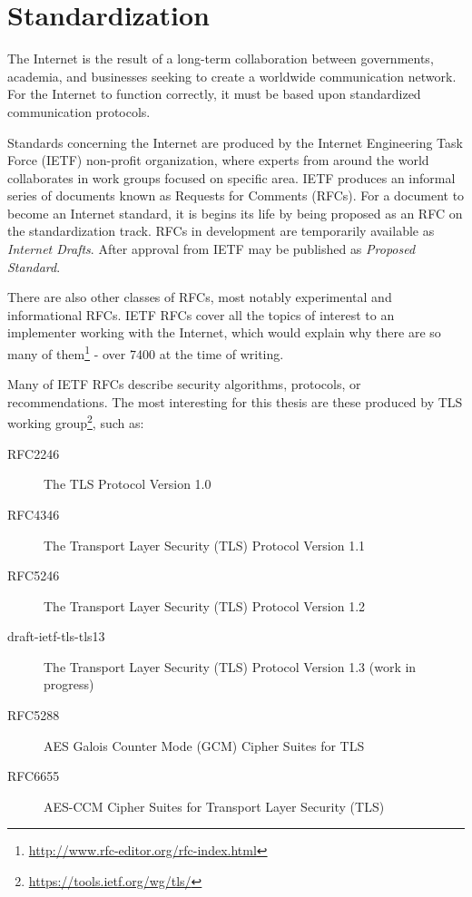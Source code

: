 \section{Standardization}

The Internet is the result of a long-term collaboration between governments, academia, and businesses seeking to create a worldwide communication network. For the Internet to function correctly, it must be based upon standardized communication protocols.

Standards concerning the Internet are produced by the Internet Engineering Task Force (IETF) non-profit organization, where experts from around the world collaborates in work groups focused on specific area. IETF produces an informal series of documents known as Requests for Comments (RFCs). For a document to become an Internet standard, it is begins its life by being proposed as an RFC on the standardization track. RFCs in development are temporarily available as \textit{Internet Drafts}. After approval from IETF may be published as \textit{Proposed Standard}. \cite{dent2004user}

There are also other classes of RFCs, most notably experimental and informational RFCs. IETF RFCs cover all the topics of interest to an implementer working with the Internet, which would explain why there are so many of them\footnote{\url{http://www.rfc-editor.org/rfc-index.html}} - over 7400 at the time of writing.

Many of IETF RFCs describe security algorithms, protocols, or recommendations. The most interesting for this thesis are these produced by TLS working group\footnote{\url{https://tools.ietf.org/wg/tls/}}, such as:

\begin{description}
  \item[RFC2246] The TLS Protocol Version 1.0
  \item[RFC4346] The Transport Layer Security (TLS) Protocol Version 1.1
  \item[RFC5246] The Transport Layer Security (TLS) Protocol Version 1.2
  \item[draft-ietf-tls-tls13] The Transport Layer Security (TLS) Protocol Version 1.3 (work in progress)
  \item[RFC5288] AES Galois Counter Mode (GCM) Cipher Suites for TLS
  \item[RFC6655] AES-CCM Cipher Suites for Transport Layer Security (TLS)
\end{description}
